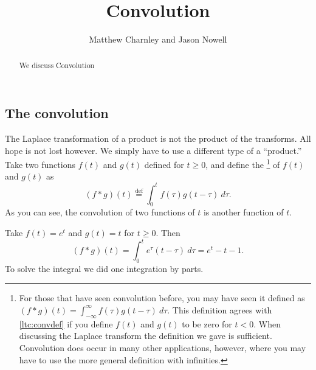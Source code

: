 \documentclass{ximera}
\title{Convolution}
\author{Matthew Charnley and Jason Nowell}
\begin{document}
\begin{abstract}
    We discuss Convolution
\end{abstract}
\maketitle

\label{convolution:section}




\subsection{The convolution}

The Laplace transformation of a product is not the product of the transforms.  All hope is not lost however.  We simply have to use a different type of a ``product.'' Take two functions $f(t)$ and $g(t)$ defined for $t \geq 0$, and define the \emph{}%
\footnote{%
    For those that have seen convolution before, you may have seen it defined as $(f * g)(t) = \int_{-\infty}^\infty f(\tau) g(t-\tau) ~ d\tau$.  This definition agrees with \eqref{ltc:convdef} if you define $f(t)$ and $g(t)$ to be zero for $t < 0$. When discussing the Laplace transform the definition we gave is sufficient.  Convolution does occur in many other applications, however, where you may have to use the more general definition with infinities.
    } 
of $f(t)$ and $g(t)$ as
\begin{equation} \label{ltc:convdef}
    (f * g)(t) \overset{\text{def}}{=} \int_0^t f(\tau) g(t-\tau) ~ d\tau .
\end{equation}
As you can see, the convolution of two functions of $t$ is another function of $t$.


\begin{example}
    Take $f(t) = e^t$ and $g(t) = t$ for $t \geq 0$.  Then 
    \begin{equation*}
        (f*g)(t) = \int_0^t e^\tau (t-\tau) ~ d\tau = e^t - t - 1 .
    \end{equation*}
    To solve the integral we did one integration by parts.
\end{example}
\end{document}
